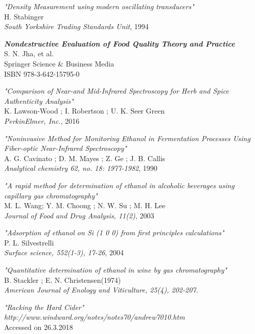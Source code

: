 \documentclass[twoside]{ctuthesis}
\theoremstyle{plain}
\theoremstyle{definition}
\theoremstyle{note}
\begin{document}
\begin{thebibliography}{9}
	\textit{"Density Measurement using modern oscillating transducers"}\\
	H. Stabinger\\
	\textit{South Yorkshire Trading Standards Unit}, 1994

	\textit{\textbf{Nondestructive Evaluation of Food Quality Theory and Practice}}\\
	S. N. Jha, et al.\\
	Springer Science \& Business Media\\
	ISBN 978-3-642-15795-0

	\textit{"Comparison of Near-and Mid-Infrared Spectroscopy for Herb and Spice Authenticity Analysis"}\\
	K. Lawson-Wood ; I. Robertson ; U. K. Seer Green\\
	\textit{PerkinElmer, Inc.}, 2016

	\textit{"Noninvasive Method for Monitoring Ethanol in Fermentation Processes Using Fiber-optic Near-Infrared Spectroscopy"}\\
	A. G. Cavinato ; D. M. Mayes ; Z. Ge ; J. B. Callis\\
	\textit{Analytical chemistry 62, no. 18: 1977-1982}, 1990

	\textit{"A rapid method for determination of ethanol in alcoholic beverages using capillary gas chromatography"}\\
	M. L. Wang; Y. M. Choong ; N. W. Su ; M. H. Lee\\
	\textit{Journal of Food and Drug Analysis, 11(2)}, 2003

	\textit{"Adsorption of ethanol on Si (1 0 0) from first principles calculations"}\\
	P. L. Silvestrelli\\
	\textit{Surface science, 552(1-3), 17-26}, 2004

	\textit{"Quantitative determination of ethanol in wine by gas chromatography"}\\
	B. Stackler ; E. N. Christensen(1974)\\
	\textit{American Journal of Enology and Viticulture, 25(4), 202-207.}

	\textit{"Racking the Hard Cider"}\\
	\textit{http://www.windward.org/notes/notes70/andrew7010.htm}\\
	Accessed on 26.3.2018


\end{thebibliography}
\end{document}
